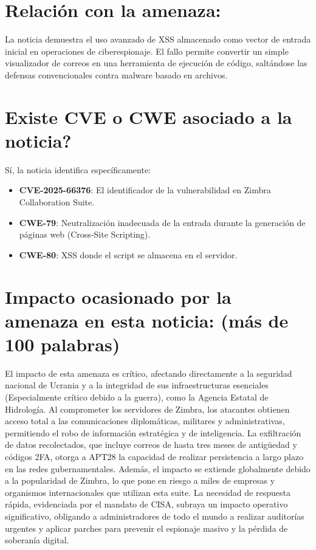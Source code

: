     \section{Relación con la amenaza:}
    La noticia demuestra el uso avanzado de XSS almacenado como vector de entrada inicial en operaciones de ciberespionaje. El fallo permite convertir un simple visualizador de correos en una herramienta de ejecución de código, saltándose las defensas convencionales contra malware basado en archivos.

    \section{\textquestiondown Existe CVE o CWE asociado a la noticia?}
    Sí, la noticia identifica específicamente:
    \begin{itemize}
        \item \textbf{CVE-2025-66376}: El identificador de la vulnerabilidad en Zimbra Collaboration Suite.
        \item \textbf{CWE-79}: Neutralización inadecuada de la entrada durante la generación de páginas web (Cross-Site Scripting).
        \item \textbf{CWE-80}: XSS donde el script se almacena en el servidor.
    \end{itemize}

    \section{Impacto ocasionado por la amenaza en esta noticia: (más de 100 palabras)}
    El impacto de esta amenaza es crítico, afectando directamente a la seguridad nacional de Ucrania y a la integridad de sus infraestructuras esenciales (Especialmente crítico debido a la guerra), como la Agencia Estatal de Hidrología. Al comprometer los servidores de Zimbra, los atacantes obtienen acceso total a las comunicaciones diplomáticas, militares y administrativas, permitiendo el robo de información estratégica y de inteligencia. La exfiltración de datos recolectados, que incluye correos de hasta tres meses de antigüedad y códigos 2FA, otorga a APT28 la capacidad de realizar persistencia a largo plazo en las redes gubernamentales. Además, el impacto se extiende globalmente debido a la popularidad de Zimbra, lo que pone en riesgo a miles de empresas y organismos internacionales que utilizan esta suite. La necesidad de respuesta rápida, evidenciada por el mandato de CISA, subraya un impacto operativo significativo, obligando a administradores de todo el mundo a realizar auditorías urgentes y aplicar parches para prevenir el espionaje masivo y la pérdida de soberanía digital.